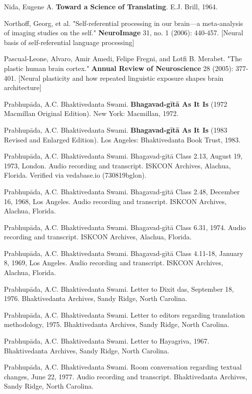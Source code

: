 \documentclass[12pt,twoside]{book}
\begin{document}
Nida, Eugene A. \textbf{Toward a Science of Translating}. E.J. Brill, 1964.

Northoff, Georg, et al. "Self-referential processing in our brain—a meta-analysis of imaging studies on the self." \textbf{NeuroImage} 31, no. 1 (2006): 440-457. [Neural basis of self-referential language processing]

Pascual-Leone, Alvaro, Amir Amedi, Felipe Fregni, and Lotfi B. Merabet. "The plastic human brain cortex." \textbf{Annual Review of Neuroscience} 28 (2005): 377-401. [Neural plasticity and how repeated linguistic exposure shapes brain architecture]

Prabhupāda, A.C. Bhaktivedanta Swami. \textbf{Bhagavad-gītā As It Is} (1972 Macmillan Original Edition). New York: Macmillan, 1972.

Prabhupāda, A.C. Bhaktivedanta Swami. \textbf{Bhagavad-gītā As It Is} (1983 Revised and Enlarged Edition). Los Angeles: Bhaktivedanta Book Trust, 1983.

Prabhupāda, A.C. Bhaktivedanta Swami. Bhagavad-gītā Class 2.13, August 19, 1973, London. Audio recording and transcript. ISKCON Archives, Alachua, Florida. Verified via vedabase.io (730819bglon).

Prabhupāda, A.C. Bhaktivedanta Swami. Bhagavad-gītā Class 2.48, December 16, 1968, Los Angeles. Audio recording and transcript. ISKCON Archives, Alachua, Florida.

Prabhupāda, A.C. Bhaktivedanta Swami. Bhagavad-gītā Class 6.31, 1974. Audio recording and transcript. ISKCON Archives, Alachua, Florida.

Prabhupāda, A.C. Bhaktivedanta Swami. Bhagavad-gītā Class 4.11-18, January 8, 1969, Los Angeles. Audio recording and transcript. ISKCON Archives, Alachua, Florida.

Prabhupāda, A.C. Bhaktivedanta Swami. Letter to Dixit das, September 18, 1976. Bhaktivedanta Archives, Sandy Ridge, North Carolina.

Prabhupāda, A.C. Bhaktivedanta Swami. Letter to editors regarding translation methodology, 1975. Bhaktivedanta Archives, Sandy Ridge, North Carolina.

Prabhupāda, A.C. Bhaktivedanta Swami. Letter to Hayagriva, 1967. Bhaktivedanta Archives, Sandy Ridge, North Carolina.

Prabhupāda, A.C. Bhaktivedanta Swami. Room conversation regarding textual changes, June 22, 1977. Audio recording and transcript. Bhaktivedanta Archives, Sandy Ridge, North Carolina.
\end{document}
